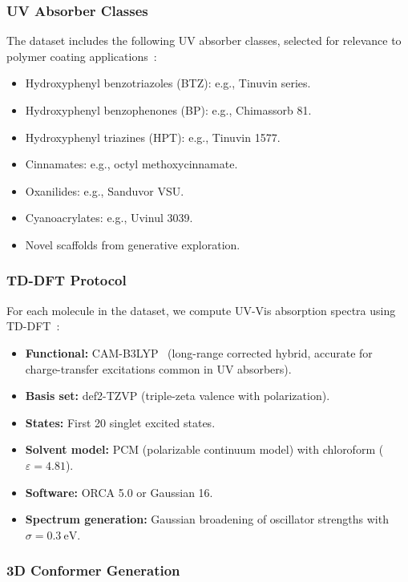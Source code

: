 \documentclass[12pt,a4paper]{article}
\begin{document}
\subsubsection{UV Absorber Classes}

The dataset includes the following UV absorber classes, selected for relevance to polymer coating applications~\cite{gugumus1995stabilization, schaller2009uv, bojinov2012photostabilizers}:
\begin{itemize}
    \item Hydroxyphenyl benzotriazoles (BTZ): e.g., Tinuvin series.
    \item Hydroxyphenyl benzophenones (BP): e.g., Chimassorb 81.
    \item Hydroxyphenyl triazines (HPT): e.g., Tinuvin 1577.
    \item Cinnamates: e.g., octyl methoxycinnamate.
    \item Oxanilides: e.g., Sanduvor VSU.
    \item Cyanoacrylates: e.g., Uvinul 3039.
    \item Novel scaffolds from generative exploration.
\end{itemize}

\subsubsection{TD-DFT Protocol}

For each molecule in the dataset, we compute UV-Vis absorption spectra using TD-DFT~\cite{casida1995tddft}:
\begin{itemize}
    \item \textbf{Functional:} CAM-B3LYP~\cite{yanai2004camb3lyp} (long-range corrected hybrid, accurate for charge-transfer excitations common in UV absorbers).
    \item \textbf{Basis set:} def2-TZVP (triple-zeta valence with polarization).
    \item \textbf{States:} First 20 singlet excited states.
    \item \textbf{Solvent model:} PCM (polarizable continuum model) with chloroform ($\varepsilon = 4.81$).
    \item \textbf{Software:} ORCA 5.0 or Gaussian 16.
    \item \textbf{Spectrum generation:} Gaussian broadening of oscillator strengths with $\sigma = \SI{0.3}{\electronvolt}$.
\end{itemize}

\subsubsection{3D Conformer Generation}
\end{document}
